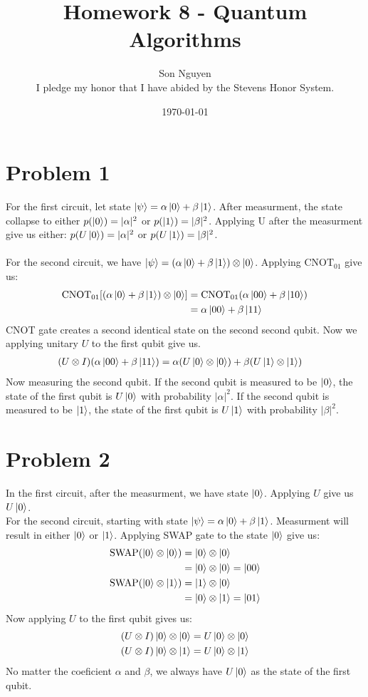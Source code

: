 \documentclass[12pt]{article}
\title{Homework 8 - Quantum Algorithms}
\author{Son Nguyen \\
I pledge my honor that I have abided by the Stevens Honor System.}
\date{\today}
\begin{document}
\maketitle
\section*{Problem 1}
\indent For the first circuit,  let state \(\ket{\psi} = \alpha \ket{0} + \beta \ket{1} \). After measurment, the state collapse to either \(p(\ket{0}) = |\alpha|^2\)
or \(p(\ket{1}) = |\beta|^2\). Applying U after the measurment give us either: \(p(U\ket{0}) = |\alpha|^2\) or \(p(U\ket{1}) = |\beta|^2\).
\\
\\
For the second circuit, we have \(\ket{\psi} =(\alpha \ket{0} + \beta \ket{1})  \otimes \ket{0}\). Applying \(\text{CNOT}_{01}\) give us:
\begin{align*}
    \text{CNOT}_{01}[(\alpha \ket{0} + \beta \ket{1}) \otimes \ket{0}] &= \text{CNOT}_{01} (\alpha \ket{00} + \beta \ket{10}) \\
    &= \alpha \ket{00} + \beta \ket{11}
\end{align*}
CNOT gate creates a second identical state on the second second qubit. Now we applying unitary \(U\) to the first qubit give us.
\begin{align*}
    (U \otimes I) (\alpha \ket{00} + \beta \ket{11}) &= \alpha(U \ket{0} \otimes \ket{0}) + \beta(U \ket{1} \otimes \ket{1})
\end{align*}
Now measuring the second qubit. If the second qubit is measured to be \(\ket{0}\), the state of the first qubit is \(U\ket{0}\) with probability \(|\alpha|^2\). If the second qubit is measured to be \(\ket{1}\), the state of the first qubit is \(U\ket{1}\) with probability \(|\beta|^2\).
\section*{Problem 2}

In the first circuit, after the measurment, we have state \(\ket{0}\). Applying \(U\) give us \(U\ket{0}\).
\\
For the second circuit, starting with state \(\ket{\psi} = \alpha \ket{0} + \beta \ket{1}\). Measurment will result in either \(\ket{0}\) or \(\ket{1}\). Applying SWAP gate to the state \(\ket{0}\) give us:
\begin{align*}
    \text{SWAP}(\ket{0} \otimes \ket{0}) &= \ket{0} \otimes \ket{0} \\
    &= \ket{0} \otimes \ket{0} = |00\rangle \\
    \text{SWAP}(\ket{0} \otimes \ket{1}) &= \ket{1} \otimes \ket{0} \\
    &= \ket{0} \otimes \ket{1} = |01\rangle
 \end{align*}
 Now applying \(U\) to the first qubit gives us: 
    \begin{align*}
        (U \otimes I) \ket{0} \otimes \ket{0} &= U\ket{0} \otimes \ket{0} \\
        (U \otimes I) \ket{0} \otimes \ket{1} &= U\ket{0} \otimes \ket{1}
    \end{align*}
No matter the coeficient \(\alpha\) and \(\beta\), we always have \(U\ket{0}\) as the state of the first qubit.
\end{document}
